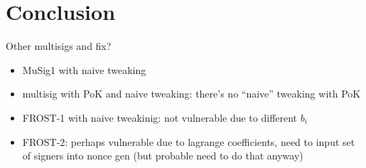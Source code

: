 \documentclass[a4paper,orivec,oribibl,english]{llncs}
\begin{document}
\section{Conclusion}
Other multisigs and fix?
\begin{itemize}
\item MuSig1 with naive tweaking
\item multisig with PoK and naive tweaking: there's no ``naive'' tweaking with PoK
\item FROST-1 with naive tweakinig: not vulnerable due to different $b_i$
\item FROST-2: perhaps vulnerable due to lagrange coefficients, need to input set of signers into nonce gen (but probable need to do that anyway)
\end{itemize}
\end{document}

